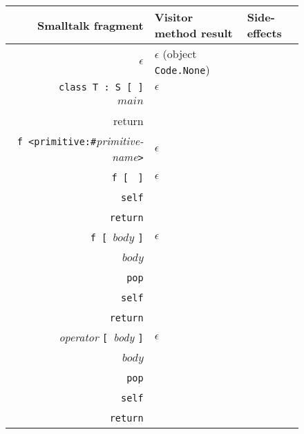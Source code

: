 \documentclass[11pt]{article}
\begin{document}

\def\arraystretch{1.0}

\begin{figure}
\begin{center}
\begin{tabular}[t]{r | l | l }
{\bf Smalltalk fragment} & {\bf Visitor method result} & {\bf Side-effects}\\
\hline
$\epsilon$ & $\epsilon$ (object {\tt Code.None}) & \\

{\tt class T : S [ ]} & $\epsilon$ & \\

$main$  & 
\begin{minipage}[t]{0.25\linewidth}
$main$\\
{\tt self\\
return}\vspace{5pt}
\end{minipage} & \\

{\tt f <primitive:\#}{\it primitive-name}{\tt >} &
\begin{minipage}[t]{0.35\linewidth}
$\epsilon$ \vspace{7pt}
\end{minipage} &  \\

{\tt f [ } {\tt ]} & $\epsilon$&
\begin{minipage}[t]{0.35\linewidth}
$\text{\tt f}_{\text{\it code}} =$ \\
\parbox{20pt}{~}{\tt self}\\
\parbox{20pt}{~}{\tt return}
\end{minipage} \\

{\tt f [ }$body$ {\tt ]} & $\epsilon$&
\begin{minipage}[t]{0.35\linewidth}
$\text{\tt f}_{\text{\it code}} =$ \\
\parbox{20pt}{~}$body$\\
\parbox{20pt}{~}{\tt pop}\\
\parbox{20pt}{~}{\tt self}\\
\parbox{20pt}{~}{\tt return}
\end{minipage} \\

{\it operator} {\tt [ }{\it body} {\tt ]} & $\epsilon$&
\begin{minipage}[t]{0.35\linewidth}
$\text{\it operator}_{\text{\it code}} =$ \\
\parbox{20pt}{~}$body$\\
\parbox{20pt}{~}{\tt pop}\\
\parbox{20pt}{~}{\tt self}\\
\parbox{20pt}{~}{\tt return}
\end{minipage} \\


\end{tabular}
\end{center}
\end{figure}
\end{document}
